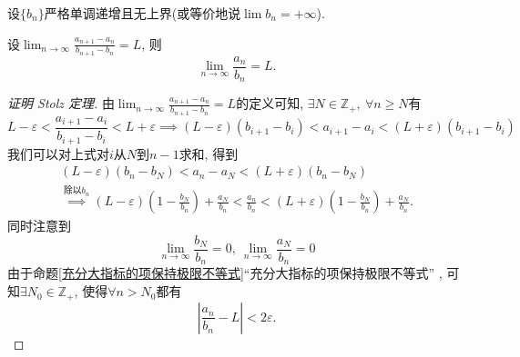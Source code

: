 \begin{theorem}
    设$\{ b_n \}$严格单调递增且无上界(或等价地说$\lim b_n = +\infty$).

    设$\displaystyle \lim_{n \to \infty} \frac{a_{n+1}-a_n}{b_{n+1}-b_n}=L$, 则
    \begin{equation}
      \lim_{n \to \infty} \frac{a_n}{b_n} = L.
    \end{equation}
\end{theorem}

\begin{proof}[证明 Stolz 定理]
    由$\displaystyle \lim_{n \to \infty} \frac{a_{n+1}-a_n}{b_{n+1}-b_n}=L$的定义可知, $\exists N \in \mathbb{Z}_{+},\ \forall n \ge N$有
    \begin{equation}
      L-\varepsilon< \frac{a_{i+1}-a_i}{b_{i+1}-b_i} < L+\varepsilon 
      \implies (L-\varepsilon)(b_{i+1}-b_{i}) < a_{i+1}-a_i < (L+\varepsilon)(b_{i+1}-b_i)
    \end{equation} 
    我们可以对上式对$i$从$N$到$n-1$求和, 得到
    \begin{gather}
      (L-\varepsilon)(b_{n}-b_{N}) < a_{n} - a_{N} < (L+\varepsilon)(b_{n}-b_{N})
      \\
      \mathop{\implies}\limits^{\text{除以}b_n}_{} 
      (L-\varepsilon)\left( 1- \frac{b_{N}}{b_n} \right) + \frac{a_{N}}{b_n} < \frac{a_n}{b_n} < (L+\varepsilon)\left( 1- \frac{b_{N}}{b_n} \right) + \frac{a_{N}}{b_n}.
    \end{gather}
    同时注意到
    \begin{equation}
      \lim_{n \to \infty} \frac{b_{N}}{b_n} = 0,\ 
      \lim_{n \to \infty} \frac{a_{N}}{b_n} = 0
    \end{equation}
    由于命题\ref{充分大指标的项保持极限不等式}``充分大指标的项保持极限不等式''
    , 可知$\exists N_0 \in \mathbb{Z}_{+}$, 使得$\forall n > N_0$都有
    \begin{equation}
      \left| \frac{a_n}{b_n}-L \right| < 2\varepsilon.
    \end{equation}
\end{proof}

